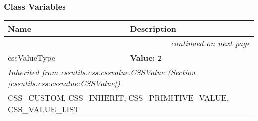 
  \subsubsection{Class Variables}

    \vspace{-1cm}
\hspace{\varindent}\begin{longtable}{|p{\varnamewidth}|p{\vardescrwidth}|l}
\cline{1-2}
\cline{1-2} \centering \textbf{Name} & \centering \textbf{Description}& \\
\cline{1-2}
\endhead\cline{1-2}\multicolumn{3}{r}{\small\textit{continued on next page}}\\\endfoot\cline{1-2}
\endlastfoot\raggedright c\-s\-s\-V\-a\-l\-u\-e\-T\-y\-p\-e\- & \raggedright \textbf{Value:} 
{\tt 2}&\\
\cline{1-2}
\multicolumn{2}{|l|}{\textit{Inherited from cssutils.css.cssvalue.CSSValue \textit{(Section \ref{cssutils:css:cssvalue:CSSValue})}}}\\
\multicolumn{2}{|p{\varwidth}|}{\raggedright CSS\_CUSTOM, CSS\_INHERIT, CSS\_PRIMITIVE\_VALUE, CSS\_VALUE\_LIST}\\
\cline{1-2}
\end{longtable}

